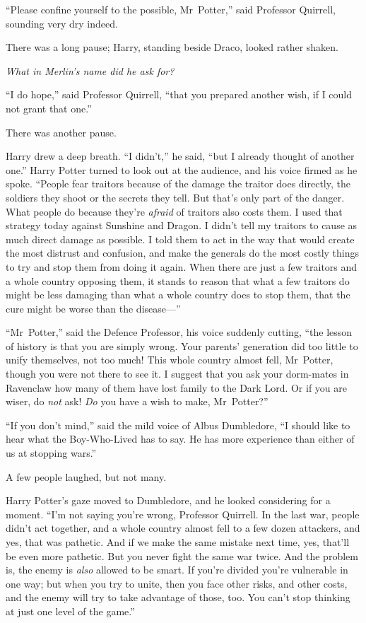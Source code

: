 “Please confine yourself to the possible, Mr~Potter,” said Professor Quirrell,
sounding very dry indeed.

There was a long pause; Harry, standing beside Draco, looked rather shaken.

\emph{What in Merlin’s name did he ask for?}

“I do hope,” said Professor Quirrell, “that you prepared another wish, if I
could not grant that one.”

There was another pause.

Harry drew a deep breath. “I didn’t,” he said, “but I already thought of
another one.” Harry Potter turned to look out at the audience, and his voice
firmed as he spoke. “People fear traitors because of the damage the traitor
does directly, the soldiers they shoot or the secrets they tell. But that’s
only part of the danger. What people do because they’re \emph{afraid} of
traitors also costs them. I used that strategy today against Sunshine and
Dragon. I didn’t tell my traitors to cause as much direct damage as possible. I
told them to act in the way that would create the most distrust and confusion,
and make the generals do the most costly things to try and stop them from doing
it again. When there are just a few traitors and a whole country opposing them,
it stands to reason that what a few traitors do might be less damaging than
what a whole country does to stop them, that the cure might be worse than the
disease—”

“Mr~Potter,” said the Defence Professor, his voice suddenly cutting, “the
lesson of history is that you are simply wrong. Your parents’ generation did
too little to unify themselves, not too much! This whole country almost fell,
Mr~Potter, though you were not there to see it. I suggest that you ask your
dorm-mates in Ravenclaw how many of them have lost family to the Dark Lord. Or
if you are wiser, do \emph{not} ask! \emph{Do} you have a wish to make,
Mr~Potter?”

“If you don’t mind,” said the mild voice of Albus Dumbledore, “I should like to
hear what the Boy-Who-Lived has to say. He has more experience than either of
us at stopping wars.”

A few people laughed, but not many.

Harry Potter’s gaze moved to Dumbledore, and he looked considering for a
moment. “I’m not saying you’re wrong, Professor Quirrell. In the last war,
people didn’t act together, and a whole country almost fell to a few dozen
attackers, and yes, that was pathetic. And if we make the same mistake next
time, yes, that’ll be even more pathetic. But you never fight the same war
twice. And the problem is, the enemy is \emph{also} allowed to be smart. If
you’re divided you’re vulnerable in one way; but when you try to unite, then
you face other risks, and other costs, and the enemy will try to take advantage
of those, too. You can’t stop thinking at just one level of the game.”

